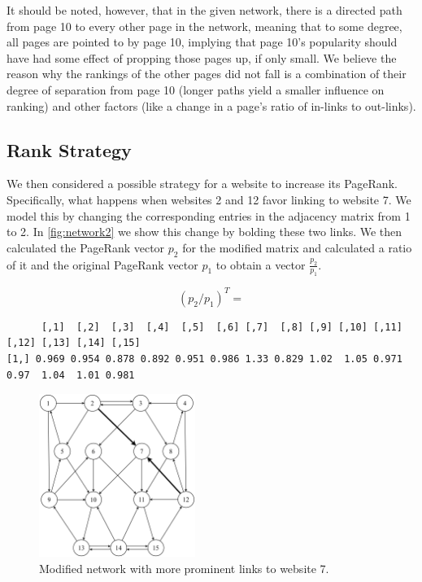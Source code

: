 \documentclass{article}
\begin{document}
It should be noted, however, that in the given network, there is a directed path from
page 10 to every other page in the network, meaning that to some degree, all
pages are pointed to by page 10, implying that page 10's popularity should have had
some effect of propping those pages up, if only small. We believe the reason why the
rankings of the other pages did not fall is a combination of their degree of separation from
page 10 (longer paths yield a smaller influence on ranking) and other factors
(like a change in a page's ratio of in-links to out-links).

\subsection{Rank Strategy}

We then considered a possible strategy for a website to increase its PageRank. Specifically, what happens when websites 2 and 12 favor linking to website 7. We model this by changing the corresponding entries in the adjacency matrix from 1 to 2. In \autoref{fig:network2} we show this change by bolding these two links. We then calculated the PageRank vector $p_2$ for the modified matrix and calculated a ratio of it and the original PageRank vector $p_1$ to obtain a vector $\frac{p_2}{p_1}$. 

\[(p_2/p_1)^T=\]
\begin{small}
\begin{verbatim}
      [,1]  [,2]  [,3]  [,4]  [,5]  [,6] [,7]  [,8] [,9] [,10] [,11] [,12] [,13] [,14] [,15]
[1,] 0.969 0.954 0.878 0.892 0.951 0.986 1.33 0.829 1.02  1.05 0.971  0.97  1.04  1.01 0.981
\end{verbatim}
\end{small}
\begin{figure}[H]
    \centering
    \includegraphics[width=2in]{images/network-2.png} 
    \caption{Modified network with more prominent links to website 7.}
    \label{fig:network2}
\end{figure}
\end{document}
